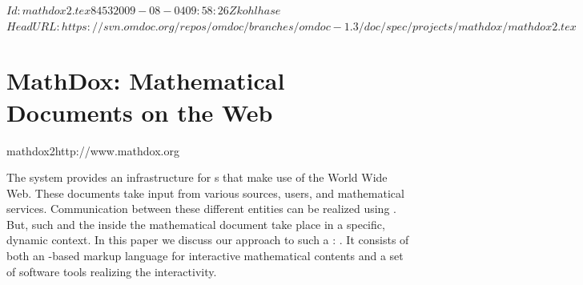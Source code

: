 \svnInfo $Id: mathdox2.tex 8453 2009-08-04 09:58:26Z kohlhase $
\svnKeyword $HeadURL: https://svn.omdoc.org/repos/omdoc/branches/omdoc-1.3/doc/spec/projects/mathdox/mathdox2.tex $

\section[MathDox]{MathDox: Mathematical Documents on the Web}
\begin{project}{mathdox2}{http://www.mathdox.org}
\end{project}
\renewcommand{\CAS}{\indextoo{CAS}}


\begin{pabstract}
  The {\MathDox} system provides an infrastructure for
  {s} that make use of the World Wide Web.
  These documents take input from various sources, users, and mathematical services.
  Communication between these different entities can be realized using {\openmath}.  But,
  such {} and the {} inside the
  mathematical document take place in a specific, dynamic context. In this paper we
  discuss our approach to such a {}: {\MathDox}.
  It consists of both an {\xml}-based markup language for interactive mathematical
  contents and a set of software tools realizing the interactivity.
\end{pabstract}



